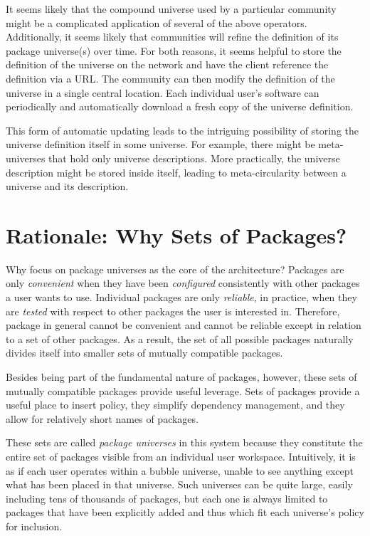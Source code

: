 \documentclass{IEEEtran}
\begin{document}
It seems likely that the compound universe used by a particular
community might be a complicated application of several of the above
operators.  Additionally, it seems likely that communities will
refine the definition of its package universe(s) over time.  For both
reasons, it seems helpful to store the definition of the universe on
the network and have the client reference the definition via a URL.
The community can then modify the definition of the universe in a
single central location.  Each individual user's software can
periodically and automatically download a fresh copy of the universe
definition.

This form of automatic updating leads to the intriguing possibility of
storing the universe definition itself in some universe.  For example,
there might be meta-universes that hold only universe descriptions.
More practically, the universe description might be stored inside
itself, leading to meta-circularity between a universe and its
description.



\section{Rationale: Why Sets of Packages?}

Why focus on package universes as the core of the architecture?
Packages are only \emph{convenient} when they have been
\emph{configured} consistently with other packages a user wants to
use.  Individual packages are only \emph{reliable}, in practice, when
they are \emph{tested} with respect to other packages the user is
interested in.  Therefore, package in general cannot be convenient and
cannot be reliable except in relation to a set of other packages.
As a result, the set of all possible packages naturally divides itself into
smaller sets of mutually compatible packages.

Besides being part of the fundamental nature of packages, however,
these sets of mutually compatible packages provide useful leverage.
Sets of packages provide a useful place to insert policy, they
simplify dependency management, and they allow for relatively short
names of packages.

These sets are called \emph{package universes} in this system because
they constitute the entire set of packages visible from an individual
user workspace.  Intuitively, it is as if each user operates within a
bubble universe, unable to see anything except what has been placed in
that universe.  Such universes can be quite large, easily including
tens of thousands of packages, but each one is always limited to
packages that have been explicitly added and thus which fit each
universe's policy for inclusion.
\end{document}
